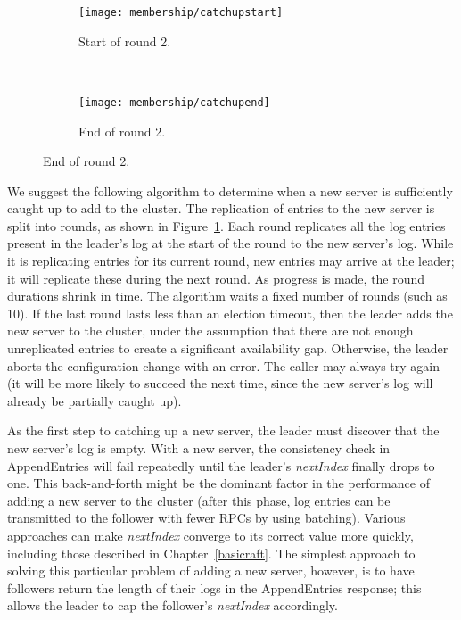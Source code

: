 \begin{figure}
\centering

\begin{subfigure}{.43\textwidth}
\centering
\texttt{[image: membership/catchupstart]}
\caption{
Start of round 2.
}
\end{subfigure}
~
\begin{subfigure}{.48\textwidth}
\centering
\texttt{[image: membership/catchupend]}
\caption{
End of round 2.
}
\end{subfigure}

\label{fig:membership:catchup}
\end{figure}

We suggest the following algorithm to determine when a new server is
sufficiently caught up to add to the cluster. The replication of entries
to the new server is split into rounds, as shown in
Figure~\ref{fig:membership:catchup}.
Each round replicates all the log entries present in the leader's log at
the start of the round to the new server's log. While it is replicating
entries for its current round, new entries may arrive at the leader; it
will replicate these during the next round. As progress is made, the
round durations shrink in time. The algorithm waits a fixed number of
rounds (such as 10). If the last round lasts less than an election
timeout, then the leader adds the new server to the cluster, under the
assumption that there are not enough unreplicated entries to create a
significant availability gap. Otherwise, the leader aborts the
configuration change with an error. The caller may always try again (it
will be more likely to succeed the next time, since the new server's log
will already be partially caught up).

As the first step to catching up a new server, the leader must discover
that the new server's log is empty. With a new server, the consistency
check in AppendEntries will fail repeatedly until the leader's
\emph{nextIndex} finally drops to one. This back-and-forth might be the
dominant factor in the performance of adding a new server to the cluster
(after this phase, log entries can be transmitted to the follower with
fewer RPCs by using batching). Various approaches can make
\emph{nextIndex} converge to its correct value more quickly, including
those described in Chapter~\ref{basicraft}. The simplest approach to
solving this particular problem of adding a new server, however, is to
have followers return the length of their logs in the AppendEntries
response; this allows the leader to cap the follower's \emph{nextIndex}
accordingly.

